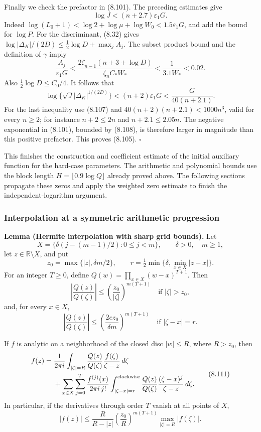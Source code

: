 \documentclass[
  11pt,
  a4paper,
]{article}
\begin{document}
Finally we check the prefactor in (8.101). The preceding estimates give
\[
\log J<(n+2.7)\varepsilon_1G.
\] Indeed \(\log(L_0+1)<\log2+\log\mu+\log W_0
<1.5\varepsilon_1G\), and add the bound for \(\log P\). For the
discriminant, (8.32) gives
\(\log|\Delta_K|/(2D)\le\frac12\log D+\max_j A_j\). The subset product
bound and the definition of \(\gamma\) imply \[
\frac{A_j}{\varepsilon_1G}<
\frac{2\zeta_{n-1}(n+3+\log D)}
{\zeta_n C_*W_*}
<\frac1{3.1W_*}<0.02.
\] Also \(\frac12\log D\le C_0/4\). It follows that \[
\log\{\sqrt J|\Delta_K|^{1/(2D)}\}
<(n+2)\varepsilon_1G<
\frac{G}{40(n+2.1)}.
\] For the last inequality use (8.107) and \(40(n+2)(n+2.1)<1000n^3\),
valid for every \(n\ge2\); for instance \(n+2\le2n\) and
\(n+2.1\le2.05n\). The negative exponential in (8.101), bounded by
(8.108), is therefore larger in magnitude than this positive prefactor.
This proves (8.105). \(\square\)

This finishes the construction and coefficient estimate of the initial
auxiliary function for the hard-case parameters. The arithmetic and
polynomial bounds use the block length \(H=\lfloor0.9\log Q\rfloor\)
already proved above. The following sections propagate these zeros and
apply the weighted zero estimate to finish the independent-logarithm
argument.

\subsubsection{Interpolation at a symmetric arithmetic
progression}\label{interpolation-at-a-symmetric-arithmetic-progression}

\textbf{Lemma (Hermite interpolation with sharp grid bounds).} Let \[
X=\{\delta(j-(m-1)/2):0\le j<m\},\qquad \delta>0,\quad m\ge1,
\] let \(z\in\mathbb R\setminus X\), and put \[
z_0=\max\{|z|,\delta m/2\},\qquad
r=\tfrac12\min\{\delta,\min_{x\in X}|z-x|\}.
\] For an integer \(T\ge0\), define \(Q(w)=\prod_{x\in X}(w-x)^{T+1}\).
Then \[
\left|\frac{Q(z)}{Q(\zeta)}\right|
\le\left(\frac{z_0}{|\zeta|}\right)^{m(T+1)}
\quad\text{if }|\zeta|>z_0,
\tag{8.109}
\] and, for every \(x\in X\), \[
\left|\frac{Q(z)}{Q(\zeta)}\right|
\le\left(\frac{2e z_0}{\delta m}\right)^{m(T+1)}
\quad\text{if }|\zeta-x|=r.
\tag{8.110}
\]

If \(f\) is analytic on a neighborhood of the closed disc \(|w|\le R\),
where \(R>z_0\), then \[
\begin{aligned}
f(z)={}&\frac1{2\pi i}\int_{|\zeta|=R}
\frac{Q(z)}{Q(\zeta)}\frac{f(\zeta)}{\zeta-z}\,d\zeta\\
&+\sum_{x\in X}\sum_{j=0}^{T}\frac{f^{(j)}(x)}{2\pi i\,j!}
\int_{|\zeta-x|=r}^{\rm clockwise}
\frac{Q(z)}{Q(\zeta)}
\frac{(\zeta-x)^j}{\zeta-z}\,d\zeta .
\end{aligned}
\tag{8.111}
\] In particular, if the derivatives through order \(T\) vanish at all
points of \(X\), \[
|f(z)|\le
\frac{R}{R-|z|}
\left(\frac{z_0}{R}\right)^{m(T+1)}
\max_{|\zeta|=R}|f(\zeta)|.
\tag{8.112}
\]
\end{document}
